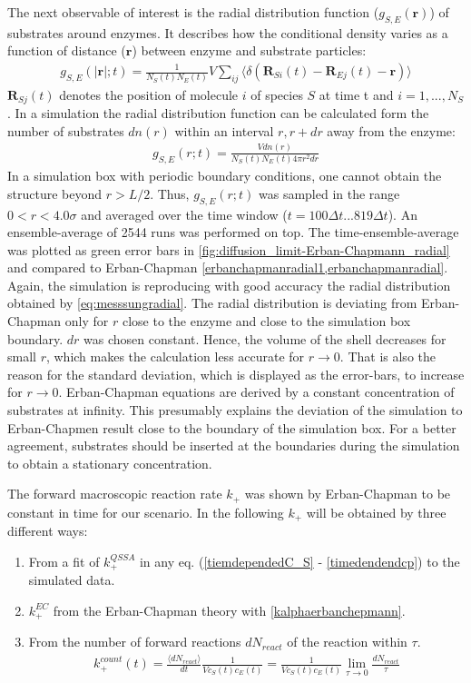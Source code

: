 \documentclass[
  a4paper,BCOR10mm,twoside,
  headsepline,footsepline,%
  fleqn,openbib
]{scrbook}
\begin{document}
The next observable of interest is the radial distribution function ($g_{S,E}(\bm{r})$) of substrates around enzymes. It describes how the conditional density varies as a function of distance ($\bm{r}$) between enzyme and substrate particles:  
\begin{align}
 g_{S,E}(|\bm{r}|;t)=\frac{1}{ N_S (t) N_E(t)} V \sum_{ij} \langle \delta(\bm{R}_{S i}(t)-\bm{R}_{E j}(t)-\bm{r})\rangle
\end{align}
 $\bm{R}_{S j}(t)$ denotes the position of molecule $i$ of species $S$ at time t and $i=1,...,N_{S}$.
In a simulation the radial distribution function can be calculated form the number of substrates $dn(r)$ within an interval $r,r+dr$ away from the enzyme:
\begin{align} 
 g_{S,E}(r;t)=\frac{V dn(r)}{  N_S (t) N_E(t) 4\pi r^2 dr} \label{eq:messsungradial}
\end{align}
In a simulation box with periodic boundary conditions, one cannot obtain the structure beyond $r>L/2$. Thus, $g_{S,E}(r;t)$ was sampled in the range $0 <r<4.0 \sigma$ and averaged over the time window ($t=100 \Delta t ...819 \Delta t$). An ensemble-average of 2544 runs was performed on top. The time-ensemble-average was plotted as green error bars in \cref{fig:diffusion_limit-Erban-Chapmann_radial} and compared to Erban-Chapman \cref{erbanchapmanradial1,erbanchapmanradial}. Again, the simulation is reproducing with good accuracy the radial distribution obtained by \cref{eq:messsungradial}. The radial distribution is deviating from Erban-Chapman only for $r$ close to the enzyme and close to the simulation box boundary. $dr$ was chosen constant. Hence, the volume of the shell decreases for small $r$, which makes the calculation less accurate for $r\rightarrow 0$. That is also the reason for the standard deviation, which is displayed as the error-bars, to increase for $r\rightarrow 0$.  Erban-Chapman equations are derived by a constant concentration of substrates at infinity. This presumably explains the deviation of the simulation to Erban-Chapmen result close to the boundary of the simulation box. For a better agreement, substrates should be inserted at the boundaries during the simulation to obtain a stationary concentration. 
\par 
The forward macroscopic reaction rate $k_+$ was shown by Erban-Chapman to be constant in time for our scenario. In the following $k_+$ will be obtained by three different ways:
\begin{enumerate}
 \item From a fit of $k^{QSSA}_+$ in any eq. (\ref{tiemdependedC_S} - \ref{timedendendcp}) to the simulated data.
 \item $k^{EC}_+$ from the Erban-Chapman theory with \cref{kalphaerbanchepmann}.
 \item From the number of forward reactions $dN_{react}$ of the reaction  within $\tau$.  
 \begin{align} \label{reactioncount}
  k^{count}_+(t)=\frac{ \langle dN_{react}\rangle}{dt}\frac{1}{V c_S(t) c_E(t)}= \frac{1}{V c_S(t) c_E(t)} \lim_{\tau \to 0} \frac{dN_{react}}{\tau}
 \end{align}
\end{enumerate}
\end{document}
